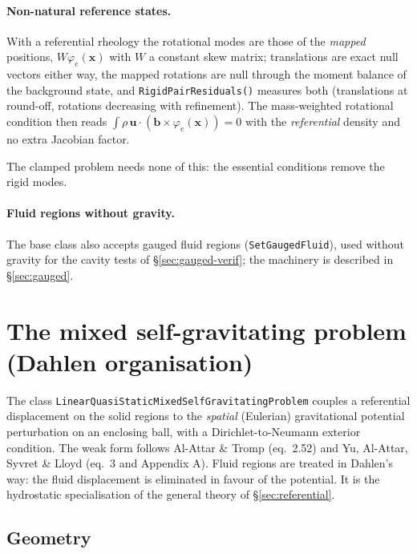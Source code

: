 \documentclass[11pt]{article}
\numberwithin{equation}{section}
\theoremstyle{remark}
\newcommand{\vu}{\mathbf{u}}
\newcommand{\vx}{\mathbf{x}}
\newcommand{\code}[1]{\texttt{#1}}
\begin{document}
\paragraph{Non-natural reference states.} With a referential rheology the
rotational modes are those of the \emph{mapped} positions,
$W\varphi_e(\vx)$ with $W$ a constant skew matrix; translations are exact null vectors either
way, the mapped rotations are null through the moment balance of the
background state, and \code{RigidPairResiduals()} measures both
(translations at round-off, rotations decreasing with refinement). The
mass-weighted rotational condition then reads $\int\rho\,\vu\cdot
(\mathbf{b}\times\varphi_e(\vx)) = 0$ with the \emph{referential} density
and no extra Jacobian factor.

The clamped problem needs none of this: the essential conditions remove
the rigid modes.

\paragraph{Fluid regions without gravity.} The base class also accepts
gauged fluid regions (\code{SetGaugedFluid}), used without gravity for
the cavity tests of \S\ref{sec:gauged-verif}; the machinery is described
in \S\ref{sec:gauged}.

\section{The mixed self-gravitating problem (Dahlen organisation)}
\label{sec:mixed}

The class \code{LinearQuasiStaticMixedSelfGravitatingProblem} couples a
referential displacement on the solid regions to the \emph{spatial}
(Eulerian) gravitational potential perturbation on an enclosing ball, with
a Dirichlet-to-Neumann exterior condition. The weak form follows Al-Attar
\& Tromp \cite{AlAttarTromp2014} (eq.~2.52) and Yu, Al-Attar, Syvret \&
Lloyd \cite{Yu2025} (eq.~3 and Appendix A). Fluid regions are treated in
Dahlen's way: the fluid displacement is eliminated in favour of the
potential. It is the hydrostatic specialisation of the general theory of
\S\ref{sec:referential}.

\subsection{Geometry}
\end{document}
